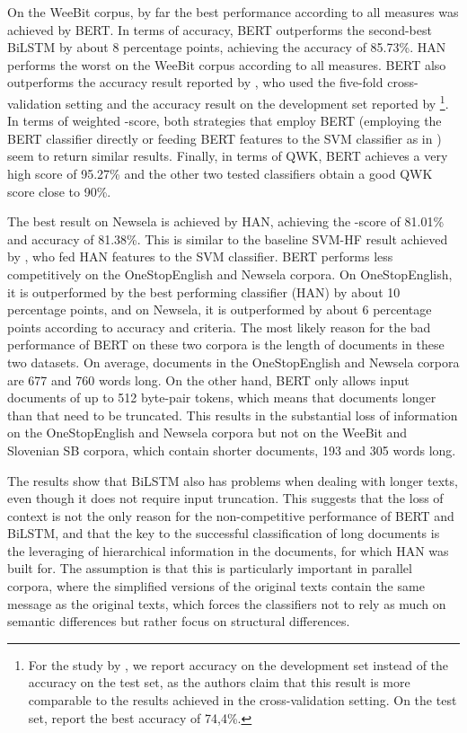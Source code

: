 \documentclass{clv3}
\begin{document}
On the WeeBit corpus, by far the best performance according to all measures was achieved by BERT. In terms of accuracy, BERT  outperforms the second-best BiLSTM by about 8 percentage points, achieving the accuracy of 85.73\%. HAN performs the worst on the WeeBit corpus according to all measures. BERT also outperforms the accuracy result reported by \citet{xia2016text}, who used the five-fold cross-validation setting and the accuracy result on the development set reported by \citet{filighera2019automatic}\footnote{For the study by \citet{filighera2019automatic}, we report accuracy on the development set instead of the accuracy on the test set, as the authors claim that this result is more comparable to the results achieved in the cross-validation setting. On the test set, \citet{filighera2019automatic} report the best accuracy of 74,4\%.}. In terms of weighted -score, both strategies that employ BERT (employing the BERT classifier directly or feeding BERT features to the SVM classifier as in \citet{deutsch2020linguistic}) seem to return similar results. Finally, in terms of QWK, BERT achieves a very high score of 95.27\% and the other two tested classifiers obtain a good   QWK score close to 90\%.  

The best result on Newsela is achieved by HAN, achieving the -score of 81.01\% and accuracy of 81.38\%. This is similar to the baseline SVM-HF result achieved by \citet{deutsch2020linguistic}, who fed HAN features to the SVM classifier. BERT performs less competitively on the OneStopEnglish and Newsela corpora. On OneStopEnglish, it is outperformed by the best performing classifier (HAN) by about 10 percentage points, and on Newsela, it is outperformed by about 6 percentage points according to accuracy and  criteria. The most likely reason for the bad performance of BERT on these two corpora is the length of documents in these two datasets. On average, documents in the OneStopEnglish and Newsela corpora are 677 and 760 words long. On the other hand, BERT only allows input documents of up to 512 byte-pair tokens, which means that documents longer than that need to be truncated. This results in the substantial loss of information on the OneStopEnglish and Newsela corpora but not on the WeeBit and Slovenian SB corpora, which contain shorter documents, 193 and 305 words long. 

The results show that BiLSTM also has problems when dealing with longer texts, even though it does not require input truncation. This suggests that the loss of context is not the only reason for the non-competitive performance of BERT and BiLSTM, and that the key to the successful classification of long documents is the leveraging of hierarchical information in the documents, for which HAN was built for. The assumption is that this is particularly important in parallel corpora, where the simplified versions of the original texts contain the same message as the original texts, which forces the classifiers not to rely as much on semantic differences but rather focus on structural differences. 
\end{document}
